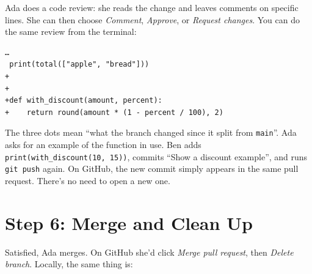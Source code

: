 
Ada does a code review: she reads the change and leaves comments on specific lines. She can then choose \emph{Comment}, \emph{Approve}, or \emph{Request changes}. You can do the same review from the terminal:

\begin{codeblock}

\begin{Shaded}
\begin{Highlighting}[]
\end{Highlighting}
\end{Shaded}

\end{codeblock}

\begin{codeblock}
\begin{Verbatim}[formatcom=\outputstyle]
…
 print(total(["apple", "bread"]))
+
+
+def with_discount(amount, percent):
+    return round(amount * (1 - percent / 100), 2)
\end{Verbatim}
\end{codeblock}

The three dots mean ``what the branch changed since it split from \texttt{main}''. Ada asks for an example of the function in use. Ben adds \texttt{print(with\_}\allowbreak{}\texttt{discount(10,}\allowbreak{}\texttt{\ 15))}, commits ``Show a discount example'', and runs \texttt{git\ push} again. On GitHub, the new commit simply appears in the same pull request. There's no need to open a new one.


\section{Step 6: Merge and Clean Up}\label{11-lab-work-on-a-project-with-someone-else:step-6-merge-and-clean-up}

Satisfied, Ada merges. On GitHub she'd click \emph{Merge pull request}, then \emph{Delete branch}. Locally, the same thing is:

\begin{codeblock}

\begin{Shaded}
\begin{Highlighting}[]
 
\end{Highlighting}
\end{Shaded}

\end{codeblock}

